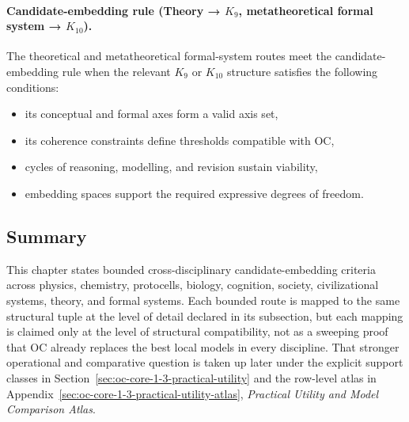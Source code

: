 \paragraph{Candidate-embedding rule (Theory → \texorpdfstring{\(K_9\)}{K9}, metatheoretical formal system → \texorpdfstring{\(K_{10}\)}{K10}).}
The theoretical and metatheoretical formal-system routes meet the
candidate-embedding rule when the relevant \(K_9\) or \(K_{10}\) structure satisfies the following
conditions:
\begin{itemize}
  \item its conceptual and formal axes form a valid axis set,
  \item its coherence constraints define thresholds compatible with OC,
  \item cycles of reasoning, modelling, and revision sustain viability,
  \item embedding spaces support the required expressive degrees of freedom.
\end{itemize}

\subsection*{Summary}

This chapter states bounded cross-disciplinary candidate-embedding criteria across
physics, chemistry, protocells, biology, cognition, society, civilizational systems,
theory, and formal systems. Each bounded route is mapped to the same structural tuple at the level of detail declared in its subsection, but each mapping is
claimed only at the level of structural compatibility, not as a sweeping proof
that OC already replaces the best local models in every discipline. That
stronger operational and comparative question is taken up later under the
explicit support classes in Section~\ref{sec:oc-core-1-3-practical-utility}
and the row-level atlas in
Appendix~\ref{sec:oc-core-1-3-practical-utility-atlas}, \emph{Practical
Utility and Model Comparison Atlas}.

